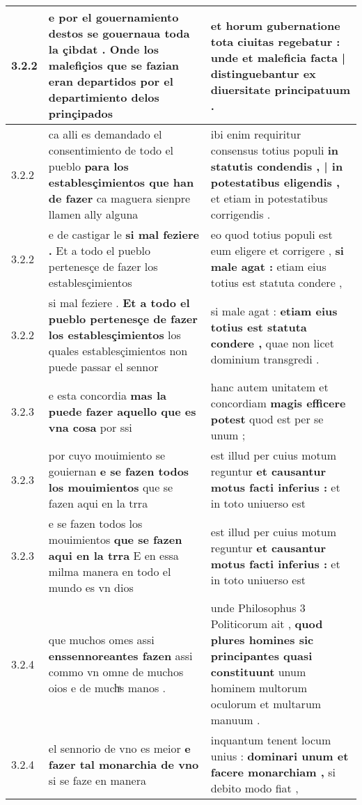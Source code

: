 \begin{tabular}{|p{1cm}|p{6.5cm}|p{6.5cm}|}
3.2.2 & e por el gouernamiento destos se gouernaua toda la çibdat . \textbf{ Onde los malefiçios que se fazian eran departidos } por el departimiento delos prinçipados & et horum gubernatione tota ciuitas regebatur : \textbf{ unde et maleficia facta | distinguebantur } ex diuersitate principatuum . \\\hline
3.2.2 & ca alli es demandado el consentimiento de todo el pueblo \textbf{ para los establesçimientos que han de fazer } ca maguera sienpre llamen ally alguna & ibi enim requiritur consensus totius populi \textbf{ in statutis condendis , | in potestatibus eligendis , } et etiam in potestatibus corrigendis . \\\hline
3.2.2 & e de castigar le \textbf{ si mal feziere . } Et a todo el pueblo pertenesçe de fazer los establesçimientos & eo quod totius populi est eum eligere et corrigere , \textbf{ si male agat : } etiam eius totius est statuta condere , \\\hline
3.2.2 & si mal feziere . \textbf{ Et a todo el pueblo pertenesçe de fazer los establesçimientos } los quales establesçimientos non puede passar el sennor & si male agat : \textbf{ etiam eius totius est statuta condere , } quae non licet dominium transgredi . \\\hline
3.2.3 & e esta concordia \textbf{ mas la puede fazer aquello que es vna cosa } por ssi & hanc autem unitatem et concordiam \textbf{ magis efficere potest } quod est per se unum ; \\\hline
3.2.3 & por cuyo mouimiento se gouiernan \textbf{ e se fazen todos los mouimientos } que se fazen aqui en la trra & est illud per cuius motum reguntur \textbf{ et causantur motus facti inferius : } et in toto uniuerso est \\\hline
3.2.3 & e se fazen todos los mouimientos \textbf{ que se fazen aqui en la trra } E en essa milma manera en todo el mundo es vn dios & est illud per cuius motum reguntur \textbf{ et causantur motus facti inferius : } et in toto uniuerso est \\\hline
3.2.4 & que muchos omes assi \textbf{ enssennoreantes fazen } assi commo vn omne de muchos oios e de muchͣs manos . & unde Philosophus 3 Politicorum ait , \textbf{ quod plures homines sic principantes quasi constituunt } unum hominem multorum oculorum et multarum manuum . \\\hline
3.2.4 & el sennorio de vno es meior \textbf{ e fazer tal monarchia de vno } si se faze en manera & inquantum tenent locum unius : \textbf{ dominari unum et facere monarchiam , } si debito modo fiat , \\\hline

\end{tabular}
